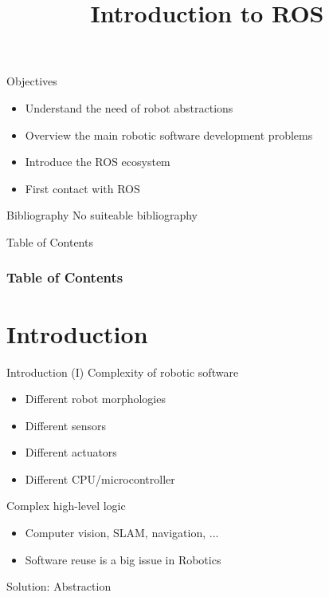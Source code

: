 \documentclass[10pt,compress]{beamer} %
\title[Introduction to ROS]{Introduction to ROS}
\author{}
\institute{\asignatura}
\date{}
\begin{document}
{\titlepageBlue
    \begin{frame}
        \titlepage
    \end{frame}
}

\begin{frame}[plain]{}
   \begin{block}{Objectives}
       \begin{itemize}
        \item Understand the need of robot abstractions
        \item Overview the main robotic software development problems
        \item Introduce the ROS ecosystem
        \item First contact with ROS
       \end{itemize}
   \end{block}

   \begin{block}{Bibliography}
       No suiteable bibliography
   \end{block}
\end{frame}

{
\eliminarNavegacion
\begin{frame}[shrink]{Table of Contents}
 \frametitle{Table of Contents}
 \tableofcontents
\end{frame}
}

\section{Introduction}

\begin{frame}{Introduction (I)}
	Complexity of robotic software
	\begin{itemize}
		\item Different robot morphologies
		\item Different sensors
		\item Different actuators
		\item Different CPU/microcontroller
  	\end{itemize}
	Complex high-level logic
	\begin{itemize}
		\item Computer vision, SLAM, navigation, ...
		\item Software reuse is a big issue in Robotics
	\end{itemize}
	Solution: Abstraction
\end{frame}
\end{document}
